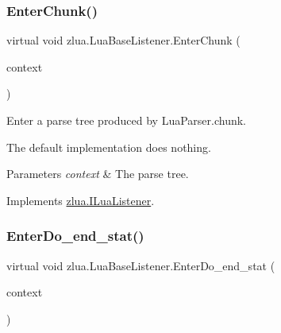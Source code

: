 \subsubsection{\texorpdfstring{Enter\+Chunk()}{EnterChunk()}}
{\footnotesize\ttfamily virtual void zlua.\+Lua\+Base\+Listener.\+Enter\+Chunk (\begin{DoxyParamCaption}\item[{\mbox{[}\+Not\+Null\mbox{]} \mbox{\hyperlink{classzlua_1_1_lua_parser_1_1_chunk_context}{Lua\+Parser.\+Chunk\+Context}}}]{context }\end{DoxyParamCaption})\hspace{0.3cm}{\ttfamily [virtual]}}



Enter a parse tree produced by Lua\+Parser.\+chunk. 

The default implementation does nothing.


\begin{DoxyParams}{Parameters}
{\em context} & The parse tree.\\
\hline
\end{DoxyParams}


Implements \mbox{\hyperlink{interfacezlua_1_1_i_lua_listener_ade4db31c82992f111a3093cde12fd632}{zlua.\+I\+Lua\+Listener}}.

\mbox{\label{classzlua_1_1_lua_base_listener_aea9c92211c8619f5d2cf426ee5380be4}} 
\subsubsection{\texorpdfstring{Enter\+Do\+\_\+end\+\_\+stat()}{EnterDo\_end\_stat()}}
{\footnotesize\ttfamily virtual void zlua.\+Lua\+Base\+Listener.\+Enter\+Do\+\_\+end\+\_\+stat (\begin{DoxyParamCaption}\item[{\mbox{[}\+Not\+Null\mbox{]} \mbox{\hyperlink{classzlua_1_1_lua_parser_1_1_do__end__stat_context}{Lua\+Parser.\+Do\+\_\+end\+\_\+stat\+Context}}}]{context }\end{DoxyParamCaption})\hspace{0.3cm}{\ttfamily [virtual]}}




